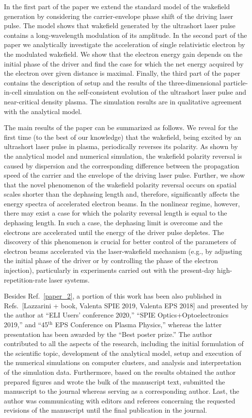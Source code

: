 \documentclass[10pt, a4paper, twoside, openright]{report}
\newcommand{\q}[1]{``#1''} %
\begin{document}
In the first part of the paper we extend the standard model of the wakefield generation by considering the carrier-envelope phase shift of the driving laser pulse. The model shows that wakefield generated by the ultrashort laser pulse contains a long-wavelength modulation of its amplitude. In the second part of the paper we analytically investigate the acceleration of single relativistic electron by the modulated wakefield. We show that the electron energy gain depends on the initial phase of the driver and find the case for which the net energy acquired by the electron over given distance is maximal. Finally, the third part of the paper contains the description of setup and the results of the three-dimensional particle-in-cell simulation on the self-consistent evolution of the ultrashort laser pulse and near-critical density plasma. The simulation results are in qualitative agreement with the analytical model.

The main results of the paper can be summarized as follows. We reveal for the first time (to the best of our knowledge) that the wakefield, being excited by an ultrashort laser pulse in plasma, periodically reverses its polarity. As shown by the analytical model and numerical simulation, the wakefield polarity reversal is caused by dispersion and the corresponding difference between the propagation speed of the carrier and the envelope of the driving laser pulse. Further, we show that the novel phenomenon of the wakefield polarity reversal occurs on spatial scales shorter than the dephasing length and, therefore, significantly affects the energy spectra of accelerated electron beams. In the nonlinear regime, however, there may exist a case for which the polarity reversal length is equal to the dephasing length. In such a case, the dephasing limit is overcome and the electrons are accelerated until the energy of the driver pulse depletes. The discovery of this phenomenon is crucial for better control of the parameters of electron beams accelerated via the laser-wakefield mechanism (e.g., by adjusting the initial phase of the driver or by controlling the phase of the electron injection), particularly in experiments carried out with the present-day high-repetition-rate laser systems.

Besides Ref.~\ref{paper_2}, a portion of this work has been also published in Refs.~[Lazzarini + book, Valenta SPIE 2019, Valenta EPS 2018] and presented by the author at \q{ELI Users' conference 2020,} \q{SPIE Optics+Optoelectronics 2019,} and \q{45$ ^{\mathrm{th}} $ EPS Conference on Plasma Physics,} whereas the latter presentation has been awarded by the \q{Best poster prize.} The author contributed to all the aspects of the research, including the initial formulation of the scientific topic, development of the analytical model, setup and execution of the numerical simulations on computer clusters, and analysis and interpretation of the simulation data. Furthermore, based on the results obtained the author prepared figures and wrote the bulk of the manuscript text, submitted the manuscript to the journal whereas serving as a corresponding author. Last, the author was communicating with editors and referees concerning the requested revisions of the manuscript until the final publication in the journal.
\end{document}
